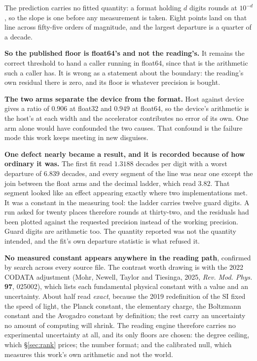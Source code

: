 The prediction carries no fitted quantity: a format holding \(d\) digits rounds at \(10^{-d}\), so the slope is one before any measurement is taken. Eight points land on that line across fifty-five orders of magnitude, and the largest departure is a quarter of a decade.

\textbf{So the published floor is float64's and not the reading's.} It remains the correct threshold to hand a caller running in float64, since that is the arithmetic such a caller has. It is wrong as a statement about the boundary: the reading's own residual there is zero, and its floor is whatever precision is bought.

\textbf{The two arms separate the device from the format.} Host against device gives a ratio of \(0.906\) at float32 and \(0.949\) at float64, so the device's arithmetic is the host's at each width and the accelerator contributes no error of its own. One arm alone would have confounded the two causes. That confound is the failure mode this work keeps meeting in new disguises.

\textbf{One defect nearly became a result, and it is recorded because of how ordinary it was.} The first fit read \(1.3188\) decades per digit with a worst departure of \(6.839\) decades, and every segment of the line was near one except the join between the float arms and the decimal ladder, which read \(3.82\). That segment looked like an effect appearing exactly where two implementations met. It was a constant in the measuring tool: the ladder carries twelve guard digits. A run asked for twenty places therefore rounds at thirty-two, and the residuals had been plotted against the requested precision instead of the working precision. Guard digits are arithmetic too. The quantity reported was not the quantity intended, and the fit's own departure statistic is what refused it.

\textbf{No measured constant appears anywhere in the reading path}, confirmed by search across every source file. The contrast worth drawing is with the 2022 CODATA adjustment (Mohr, Newell, Taylor and Tiesinga, 2025, \emph{Rev. Mod. Phys.} \textbf{97}, 025002), which lists each fundamental physical constant with a value and an uncertainty. About half read \emph{exact}, because the 2019 redefinition of the SI fixed the speed of light, the Planck constant, the elementary charge, the Boltzmann constant and the Avogadro constant by definition; the rest carry an uncertainty no amount of computing will shrink. The reading engine therefore carries no experimental uncertainty at all, and its only floors are chosen: the degree ceiling, which \S\ref{sec:rank} prices; the number format; and the calibrated null, which measures this work's own arithmetic and not the world.

